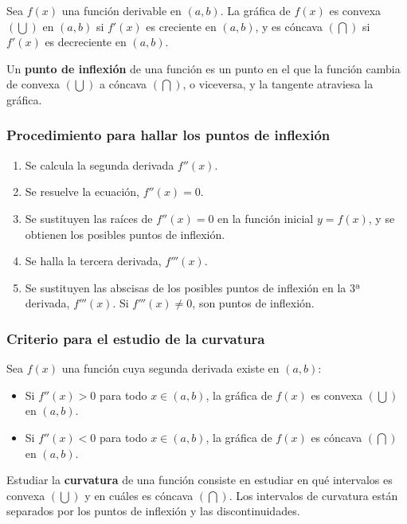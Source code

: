 Sea $f(x)$ una función derivable en $(a,b)$. La gráfica de $f(x)$ es convexa $(\bigcup)$ en $(a,b)$ si $f'(x)$ es creciente en $(a,b)$, y es cóncava $(\bigcap)$ si $f'(x)$ es decreciente en $(a,b)$.\\
\begin{definition}
Un \textbf{punto de inflexión} de una función es un punto en el que la función cambia de convexa $(\bigcup)$ a cóncava $(\bigcap)$, o viceversa, y la tangente atraviesa la gráfica.
\end{definition}

\subsubsection{Procedimiento para hallar los puntos de inflexión}
\begin{enumerate}
	\item Se calcula la segunda derivada $f''(x)$.
	\item Se resuelve la ecuación, $f''(x)=0$.
	\item Se sustituyen las raíces de $f''(x)=0$ en la función inicial $y=f(x)$, y se obtienen los posibles puntos de inflexión.
	\item Se halla la tercera derivada, $f'''(x)$.
	\item Se sustituyen las abscisas de los posibles puntos de inflexión en la 3ª derivada, $f'''(x)$. Si $f'''(x) \neq 0$, son puntos de inflexión.
\end{enumerate}
\subsubsection{Criterio para el estudio de la curvatura}
Sea $f(x)$ una función cuya segunda derivada existe en $(a,b)$:
\begin{itemize}
	\item Si $f''(x) > 0$ para todo $x \in (a,b)$, la gráfica de $f(x)$ es convexa $(\bigcup)$ en $(a,b)$.
	\item Si $f''(x) < 0$ para todo $x \in (a,b)$, la gráfica de $f(x)$ es cóncava $(\bigcap)$ en $(a,b)$.
\end{itemize}

\begin{definition}
Estudiar la \textbf{curvatura} de una función consiste en estudiar en qué intervalos es convexa $(\bigcup)$ y en cuáles es cóncava $(\bigcap)$. Los intervalos de curvatura están separados por los puntos de inflexión y las discontinuidades.
\end{definition}


